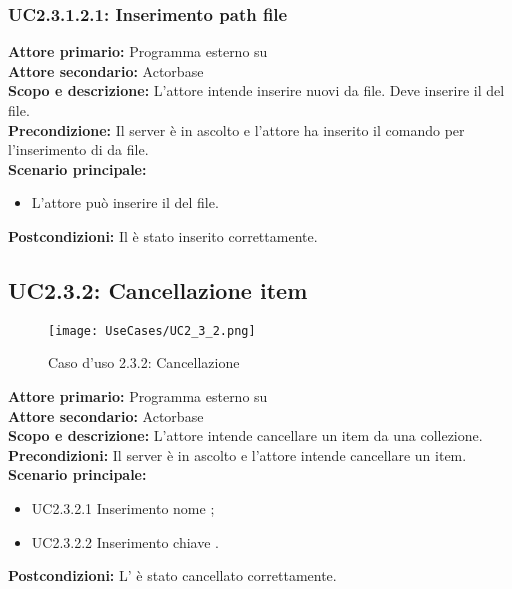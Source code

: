 \documentclass{scalatekids-article}
\begin{document}
\subsubsection{UC2.3.1.2.1: Inserimento path file} %

\textbf{Attore primario:} Programma esterno su \\
\textbf{Attore secondario:} Actorbase\\
\textbf{Scopo e descrizione:} L'attore intende inserire nuovi  da file. Deve inserire il  del file.\\
\textbf{Precondizione:} Il server è in ascolto e l'attore ha inserito il comando per l'inserimento di  da file.\\
\textbf{Scenario principale:}
\begin{itemize}
\item L'attore può inserire il  del file.
\end{itemize}
\textbf{Postcondizioni:} Il  è stato inserito correttamente.

\subsection{UC2.3.2: Cancellazione item}

\begin{figure}[H]
  \begin{center}
    \texttt{[image: UseCases/UC2\_3\_2.png]}
    \caption{Caso d'uso 2.3.2: Cancellazione }
  \end{center}
\end{figure}
\textbf{Attore primario:} Programma esterno su \\
\textbf{Attore secondario:} Actorbase\\
\textbf{Scopo e descrizione:} L'attore intende cancellare un item da una collezione.\\
\textbf{Precondizioni:} Il server è in ascolto e l'attore intende cancellare un item.\\
\textbf{Scenario principale:}
\begin{itemize}
\item UC2.3.2.1 Inserimento nome ;
\item UC2.3.2.2 Inserimento chiave .
\end{itemize}
\textbf{Postcondizioni:} L' è stato cancellato correttamente.
\end{document}
